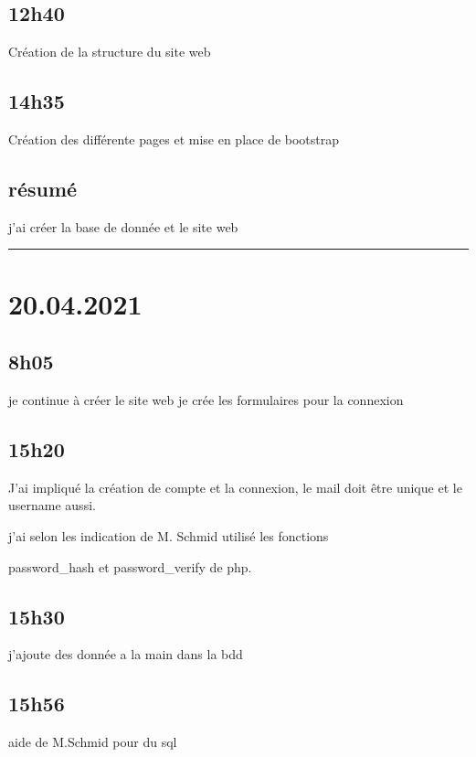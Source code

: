 \documentclass[a4paper,12pt,french]{sphinxmanual}
\begin{document}
\subsection{12h40}
\label{\detokenize{logbook:id5}}
\sphinxAtStartPar
Création de la structure du site web


\subsection{14h35}
\label{\detokenize{logbook:h35}}
\sphinxAtStartPar
Création des différente pages et mise en place de bootstrap


\subsection{résumé}
\label{\detokenize{logbook:resume}}
\sphinxAtStartPar
j’ai créer la base de donnée et le site web


\bigskip\hrule\bigskip



\section{20.04.2021}
\label{\detokenize{logbook:id6}}

\subsection{8h05}
\label{\detokenize{logbook:id7}}
\sphinxAtStartPar
je continue à créer le site web je crée les formulaires pour la connexion


\subsection{15h20}
\label{\detokenize{logbook:id8}}
\sphinxAtStartPar
J’ai impliqué la création de compte et la connexion, le mail doit être unique et le username aussi.

\sphinxAtStartPar
j’ai selon les indication de M. Schmid utilisé les fonctions

\sphinxAtStartPar
password\_hash et password\_verify de php.


\subsection{15h30}
\label{\detokenize{logbook:id9}}
\sphinxAtStartPar
j’ajoute des donnée a la main dans la bdd


\subsection{15h56}
\label{\detokenize{logbook:h56}}
\sphinxAtStartPar
aide de M.Schmid pour du sql
\end{document}

